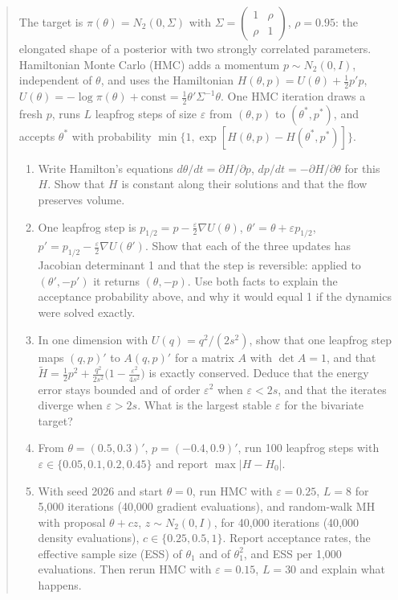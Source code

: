 \documentclass[11pt,a4paper]{article}
\newenvironment{enunciado}{\begin{quote}}{\end{quote}}
\begin{document}
\begin{enunciado}
The target is $\pi(\theta)=N_2(0,\Sigma)$ with $\Sigma=\begin{pmatrix}1&\rho\\\rho&1\end{pmatrix}$, $\rho=0.95$: the elongated shape of a posterior with two strongly correlated parameters. Hamiltonian Monte Carlo (HMC) adds a momentum $p\sim N_2(0,I)$, independent of $\theta$, and uses the Hamiltonian $H(\theta,p)=U(\theta)+\frac12p'p$, $U(\theta)=-\log\pi(\theta)+\text{const}=\frac12\theta'\Sigma^{-1}\theta$. One HMC iteration draws a fresh $p$, runs $L$ leapfrog steps of size $\varepsilon$ from $(\theta,p)$ to $(\theta^*,p^*)$, and accepts $\theta^*$ with probability $\min\{1,\exp[H(\theta,p)-H(\theta^*,p^*)]\}$.
\begin{enumerate}[label=\textbf{(\alph*)},leftmargin=2em]
\item Write Hamilton's equations $d\theta/dt=\partial H/\partial p$, $dp/dt=-\partial H/\partial\theta$ for this $H$. Show that $H$ is constant along their solutions and that the flow preserves volume.
\item One leapfrog step is $p_{1/2}=p-\frac\varepsilon2\nabla U(\theta)$, $\theta'=\theta+\varepsilon p_{1/2}$, $p'=p_{1/2}-\frac\varepsilon2\nabla U(\theta')$. Show that each of the three updates has Jacobian determinant 1 and that the step is reversible: applied to $(\theta',-p')$ it returns $(\theta,-p)$. Use both facts to explain the acceptance probability above, and why it would equal 1 if the dynamics were solved exactly.
\item In one dimension with $U(q)=q^2/(2s^2)$, show that one leapfrog step maps $(q,p)'$ to $A(q,p)'$ for a matrix $A$ with $\det A=1$, and that $\tilde H=\frac12p^2+\frac{q^2}{2s^2}\big(1-\frac{\varepsilon^2}{4s^2}\big)$ is exactly conserved. Deduce that the energy error stays bounded and of order $\varepsilon^2$ when $\varepsilon<2s$, and that the iterates diverge when $\varepsilon>2s$. What is the largest stable $\varepsilon$ for the bivariate target?
\item From $\theta=(0.5,0.3)'$, $p=(-0.4,0.9)'$, run 100 leapfrog steps with $\varepsilon\in\{0.05,0.1,0.2,0.45\}$ and report $\max|H-H_0|$.
\item With seed 2026 and start $\theta=0$, run HMC with $\varepsilon=0.25$, $L=8$ for 5{,}000 iterations (40{,}000 gradient evaluations), and random-walk MH with proposal $\theta+cz$, $z\sim N_2(0,I)$, for 40{,}000 iterations (40{,}000 density evaluations), $c\in\{0.25,0.5,1\}$. Report acceptance rates, the effective sample size (ESS) of $\theta_1$ and of $\theta_1^2$, and ESS per 1{,}000 evaluations. Then rerun HMC with $\varepsilon=0.15$, $L=30$ and explain what happens.
\end{enumerate}
\end{enunciado}
\end{document}
